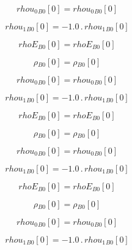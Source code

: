 \documentclass{article}
\begin{document}
\begin{dmath}{rhou_{0}{_{B0}}}[{0}] = {rhou_{0}{_{B0}}}[{0}]\end{dmath}

\begin{dmath}{rhou_{1}{_{B0}}}[{0}] = - 1.0 \,.\, {rhou_{1}{_{B0}}}[{0}]\end{dmath}

\begin{dmath}{rhoE{_{B0}}}[{0}] = {rhoE{_{B0}}}[{0}]\end{dmath}

\begin{dmath}{\rho{_{B0}}}[{0}] = {\rho{_{B0}}}[{0}]\end{dmath}

\begin{dmath}{rhou_{0}{_{B0}}}[{0}] = {rhou_{0}{_{B0}}}[{0}]\end{dmath}

\begin{dmath}{rhou_{1}{_{B0}}}[{0}] = - 1.0 \,.\, {rhou_{1}{_{B0}}}[{0}]\end{dmath}

\begin{dmath}{rhoE{_{B0}}}[{0}] = {rhoE{_{B0}}}[{0}]\end{dmath}

\begin{dmath}{\rho{_{B0}}}[{0}] = {\rho{_{B0}}}[{0}]\end{dmath}

\begin{dmath}{rhou_{0}{_{B0}}}[{0}] = {rhou_{0}{_{B0}}}[{0}]\end{dmath}

\begin{dmath}{rhou_{1}{_{B0}}}[{0}] = - 1.0 \,.\, {rhou_{1}{_{B0}}}[{0}]\end{dmath}

\begin{dmath}{rhoE{_{B0}}}[{0}] = {rhoE{_{B0}}}[{0}]\end{dmath}

\begin{dmath}{\rho{_{B0}}}[{0}] = {\rho{_{B0}}}[{0}]\end{dmath}

\begin{dmath}{rhou_{0}{_{B0}}}[{0}] = {rhou_{0}{_{B0}}}[{0}]\end{dmath}

\begin{dmath}{rhou_{1}{_{B0}}}[{0}] = - 1.0 \,.\, {rhou_{1}{_{B0}}}[{0}]\end{dmath}
\end{document}
